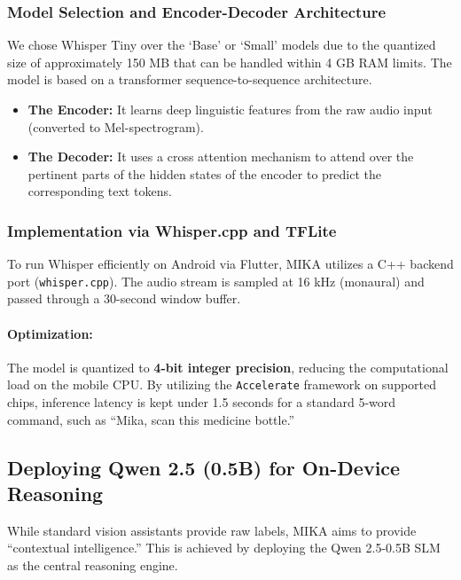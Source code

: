 \documentclass[12pt,a4paper]{report}
\begin{document}
\subsubsection{Model Selection and Encoder-Decoder Architecture}
We chose Whisper Tiny over the ‘Base’ or ‘Small’ models due to the quantized size of approximately 150 MB that can be handled within 4 GB RAM limits. The model is based on a transformer sequence-to-sequence architecture. 

\begin{itemize}
    \item \textbf{The Encoder:} It learns deep linguistic features from the raw audio input (converted to Mel-spectrogram). 
    \item \textbf{The Decoder:} It uses a cross attention mechanism to attend over the pertinent parts of the hidden states of the encoder to predict the corresponding text tokens.
\end{itemize}
 
\subsubsection{Implementation via Whisper.cpp and TFLite}
To run Whisper efficiently on Android via Flutter, MIKA utilizes a C++ backend port (\texttt{whisper.cpp}). The audio stream is sampled at 16 kHz (monaural) and passed through a 30-second window buffer. 
\paragraph{Optimization:} The model is quantized to \textbf{4-bit integer precision}, reducing the computational load on the mobile CPU. By utilizing the \texttt{Accelerate} framework on supported chips, inference latency is kept under 1.5 seconds for a standard 5-word command, such as ``Mika, scan this medicine bottle.''
 
\subsection{Deploying Qwen 2.5 (0.5B) for On-Device Reasoning}
 
While standard vision assistants provide raw labels, MIKA aims to provide ``contextual intelligence.'' This is achieved by deploying the Qwen 2.5-0.5B SLM as the central reasoning engine.
 
\end{document}

